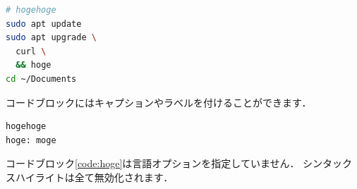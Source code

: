 \documentclass[uplatex, a4paper]{jsarticle}
\begin{document}
\begin{lstlisting}[language=sh]
# hogehoge
sudo apt update
sudo apt upgrade \
  curl \
  && hoge
cd ~/Documents
\end{lstlisting}

  コードブロックにはキャプションやラベルを付けることができます．

\begin{lstlisting}[caption=Generic Language Code Block, label=code:hoge]
hogehoge
hoge: moge
\end{lstlisting}

  コードブロック\ref{code:hoge}は言語オプションを指定していません．
  シンタックスハイライトは全て無効化されます．
\end{document}
